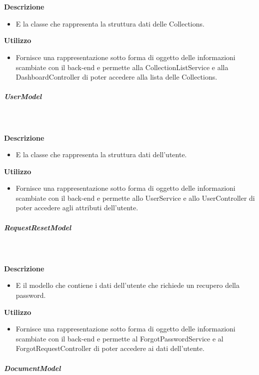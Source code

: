         \textbf{\\ \\ Descrizione} 
          \begin{itemize}
            \item[] E la classe che rappresenta la struttura dati delle Collections.
          \end{itemize}      
        \textbf{Utilizzo}  
          \begin{itemize}
            \item[] Fornisce una rappresentazione sotto forma di oggetto delle informazioni scambiate con il back-end e permette alla CollectionListService e alla DashboardController di poter accedere alla lista delle Collections.
          \end{itemize}
      \subparagraph{UserModel}
        
        \textbf{\\ \\ Descrizione} 
          \begin{itemize}
            \item[] E la classe che rappresenta la struttura dati dell'utente.
          \end{itemize}      
        \textbf{Utilizzo}  
          \begin{itemize}
            \item[] Fornisce una rappresentazione sotto forma di oggetto delle informazioni scambiate con il back-end e permette allo UserService e allo UserController di poter accedere agli attributi dell'utente.
          \end{itemize}
      \subparagraph{RequestResetModel}
        
        \textbf{\\ \\ Descrizione} 
          \begin{itemize}
            \item[] E il modello che contiene i dati dell'utente che richiede un recupero della password.
          \end{itemize}      
        \textbf{Utilizzo}  
          \begin{itemize}
            \item[] Fornisce una rappresentazione sotto forma di oggetto delle informazioni scambiate con il back-end e permette al ForgotPasswordService e al ForgotRequestController di poter accedere ai dati dell'utente.
          \end{itemize}
      \subparagraph{DocumentModel}
        
